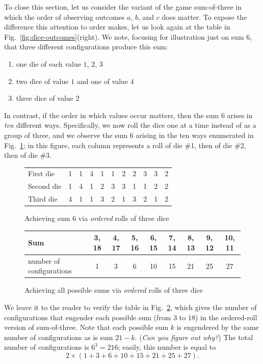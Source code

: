 \bigskip

To close this section, let us consider the variant of the game
sum-of-three in which the order of observing outcomes $a$, $b$, and
$c$ does matter.  To expose the difference this attention to order makes,
let us look again at the table in Fig.~\ref{fig:dice-outcomes}(right).
We note, focusing for illustration just on sum $6$, that three
different configurations produce this sum:
\begin{enumerate}
\item one die of each value $1$, $2$, $3$
\item two dice of value $1$ and one of value $4$
\item three dice of value $2$
\end{enumerate}
In contrast, if the order in which values occur matters, then the
sum $6$ arises in {\em ten} different ways.  Specifically, we now
roll the dice one at a time instead of as a group of three, and we
observe the sum $6$ arising in the ten ways enumerated in
Fig.~\ref{fig:dice-ordered-outcomes}; in this figure, each column
represents a roll of die \#1, then of die \#2, then of die \#3.
\begin{figure}[htb]
\begin{center}
\begin{tabular}{|l||c|c|c|c|c|c|c|c|c|c|}
\hline
First die & 1 & 1 & 4 & 1 & 1 & 2 & 2 & 3 & 3 & 2   \\

Second die & 1 & 4 & 1 & 2 & 3 & 3 & 1 & 1 & 2 & 2   \\

Third die & 4 & 1 & 1 & 3 & 2 & 1 & 3 & 2 & 1 & 2  \\
\hline
\end{tabular}
\end{center}
\caption{Achieving sum $6$ via {\em ordered} rolls of three dice}
\label{fig:dice-ordered-outcomes}
\end{figure}

\medskip

\begin{figure}[htb]
\begin{center}
\begin{tabular}{|l||c|c|c|c|c|c|c|c|}
\hline
Sum & 3, 18 & 4, 17 & 5, 16 & 6, 15 & 7, 14 & 8, 13 & 9, 12 & 10, 11  \\
\hline
number of configurations & 1 & 3 & 6 & 10 & 15 & 21 & 25 & 27  \\
\hline
\end{tabular}
\end{center}
\caption{Achieving all possible sums via {\em ordered} rolls of three dice}
\label{fig:dice-ordered-configs}
\end{figure}
We leave it to the reader to verify the table in Fig.~\ref{fig:dice-ordered-configs}, 
which gives the number of configurations that engender each possible sum (from $3$ to $18$) 
in the ordered-roll version of sum-of-three.  Note that each possible sum $k$ is engendered 
by the same number of configurations as is sum $21- k$.  ({\em Can you figure out why?})  
The total number of configurations is $6^3 = 216$; easily, this number is equal to
\[ 2 \times (1 + 3 + 6 + 10 + 15 + 21 + 25 + 27). \]


